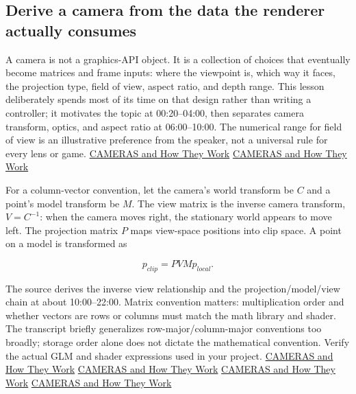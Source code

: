 \subsection{Derive a camera from the data the renderer actually consumes}\label{06-engine-ii-ch026-derive-a-camera-from-the-data-the-renderer-actually-consumes}

\hypertarget{06-engine-ii-ch026-derive-a-camera-from-the-data-the-renderer-actually-consumes}{}

A camera is not a graphics-API object. It is a collection of choices that eventually become matrices and frame inputs: where the viewpoint is, which way it faces, the projection type, field of view, aspect ratio, and depth range. This lesson deliberately spends most of its time on that design rather than writing a controller; it motivates the topic at 00:20--04:00, then separates camera transform, optics, and aspect ratio at 06:00--10:00. The numerical range for field of view is an illustrative preference from the speaker, not a universal rule for every lens or game. \href{https://www.youtube.com/watch?v=LfbqtmqxX04&t=20s}{CAMERAS and How They Work} \href{https://www.youtube.com/watch?v=LfbqtmqxX04&t=360s}{CAMERAS and How They Work}

For a column-vector convention, let the camera's world transform be \(C\) and a point's model transform be \(M\). The view matrix is the inverse camera transform, \(V=C^{-1}\): when the camera moves right, the stationary world appears to move left. The projection matrix \(P\) maps view-space positions into clip space. A point on a model is transformed as

\[p_{clip}=PVMp_{local}.\]

The source derives the inverse view relationship and the projection/model/view chain at about 10:00--22:00. Matrix convention matters: multiplication order and whether vectors are rows or columns must match the math library and shader. The transcript briefly generalizes row-major/column-major conventions too broadly; storage order alone does not dictate the mathematical convention. Verify the actual GLM and shader expressions used in your project. \href{https://www.youtube.com/watch?v=LfbqtmqxX04&t=600s}{CAMERAS and How They Work} \href{https://www.youtube.com/watch?v=LfbqtmqxX04&t=960s}{CAMERAS and How They Work} \href{https://www.youtube.com/watch?v=LfbqtmqxX04&t=1140s}{CAMERAS and How They Work} \href{https://www.youtube.com/watch?v=LfbqtmqxX04&t=1320s}{CAMERAS and How They Work}

